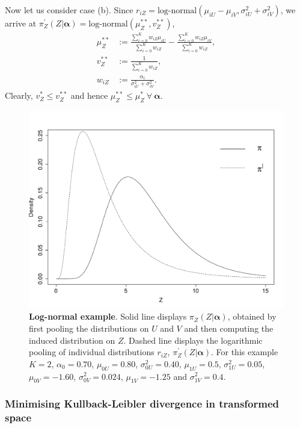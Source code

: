 \documentclass[a4paper, notitlepage, 10pt]{article}
\begin{document}
Now let us consider case (b).
Since $r_{iZ} = \text{log-normal}(\mu_{iU} - \mu_{iV}, \sigma_{iU}^2 +  \sigma_{iV}^2)$, we arrive at  $\pi_Z^{\prime}(Z |  \boldsymbol \alpha) = \text{log-normal}(\mu_Z^{\ast\ast}, v_Z^{\ast\ast})$,
\begin{align}
 \mu_Z^{\ast\ast} &:= \frac{\sum_{i=0}^K w_{iZ} \mu_{iU}}{\sum_{i=0}^K w_{iZ}} - \frac{\sum_{i=0}^K w_{iZ} \mu_{iV}}{\sum_{i=0}^K w_{iZ}}, \\
 v_Z^{\ast\ast} &:= \frac{1}{\sum_{i=0}^K w_{iZ} }, \\
 w_{iZ} &:=  \frac{\alpha_i}{\sigma_{iU}^2 + \sigma_{iV}^2}.
\end{align}
Clearly, $v_Z^{\ast} \leq v_Z^{\ast\ast}$ and hence $\mu_Z^{\ast\ast} \leq \mu_Z^{\ast} \: \forall \: \boldsymbol\alpha$.

\begin{figure}[!ht]
\centering
\includegraphics[scale=0.5]{figures/lognormal_example.pdf}
\caption{\textbf{Log-normal example}. Solid line displays $\pi_Z(Z | \boldsymbol\alpha)$, obtained by first pooling the distributions on $U$ and $V$ and then computing the induced distribution on $Z$.
Dashed line displays the logarithmic pooling of individual distributions $r_{iZ}$, $\pi_Z^{\prime}(Z | \boldsymbol\alpha)$.
For this example $K=2$, $\alpha_0 = 0.70$, $\mu_{0U} = 0.80$, $\sigma_{0U}^2 = 0.40$, $\mu_{1U} = 0.5$, $\sigma_{1U}^2 = 0.05$, $\mu_{0V} = -1.60$, $\sigma_{0V}^2 = 0.024$, $\mu_{1V} = -1.25$ and  $\sigma_{1V}^2 = 0.4$.
}
\label{fig:lognormal_example}
\end{figure}


\subsubsection*{Minimising Kullback-Leibler divergence in transformed space}
\end{document}
